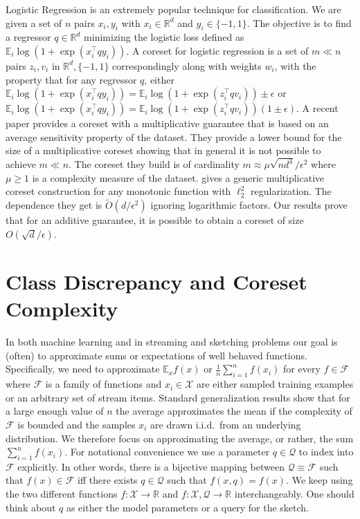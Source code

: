 \documentclass[anon,12pt]{colt2019} %
\newcommand{\R}{\mathbb{R}}
\newcommand{\E}{\mathbb{E}}
\newcommand{\eps}{\epsilon}
\newcommand{\F}{\mathcal{F}}
\newcommand{\X}{\mathcal{X}}
\newcommand{\Q}{\mathcal{Q}}
\begin{document}
Logistic Regression is an extremely popular technique for classification. We are given a set of $n$ pairs $x_i,y_i$ with $x_i \in \R^d$ and $y_i \in \{-1,1\}$. The objective is to find a regressor $q \in \R^d$ minimizing the logistic loss defined as $\E_i \log(1+\exp(x_i^\top q y_i))$. A coreset for logistic regression is a set of $m \ll n$ pairs $z_i, v_i$ in $\R^d, \{-1,1\}$ correspondingly along with weights $w_i$, with the property that for any regressor $q$, either $\E_i \log(1+\exp(x_i^\top q y_i)) = \E_i \log(1+\exp(z_i^\top q v_i)) \pm \eps$ or $\E_i \log(1+\exp(x_i^\top q y_i)) = \E_i \log(1+\exp(z_i^\top q v_i)) (1 \pm \eps)$. A recent paper \cite{DBLP:journals/corr/abs-1805-08571} provides a coreset with a multiplicative guarantee that is based on an average sensitivity property of the dataset. They provide a lower bound for the size of a multiplicative coreset showing that in general it is not possible to achieve $m \ll n$. The coreset they build is of cardinality $m \approx \mu\sqrt{nd^3}/\eps^2$ where $\mu \geq 1$ is a complexity measure of the dataset.  \cite{tolochinsky2018coresets} gives a generic multiplicative coreset construction for any monotonic function with $\ell_2^2$ regularization. The dependence they get is $\tilde O(d/\eps^2)$ ignoring logarithmic factors.  Our results prove that for an additive guarantee, it is possible to obtain a coreset of size $O(\sqrt{d}/\eps)$.


\section{Class Discrepancy and Coreset Complexity}

In both machine learning and in streaming and sketching problems our goal is (often) to approximate sums or expectations of well behaved functions.
Specifically, we need to approximate $\E_x f(x)$ or $\frac{1}{n}\sum_{i=1}^{n} f(x_i)$ for every $f\in \F$ where $\F$ is a family of functions and $x_i \in \X$ are either sampled training examples or an arbitrary set of stream items. 
Standard generalization results show that for a large enough value of $n$ the average approximates the mean if the complexity of $\F$ is bounded and the samples $x_i$ are drawn i.i.d.\ from an underlying distribution. We therefore focus on approximating the average, or rather, the sum $\sum_{i=1}^{n} f(x_i)$. For notational convenience we use a parameter $q \in \Q$ to index into $\F$ explicitly. 
In other words, there is a bijective mapping between $\Q \equiv \F$ such that $f(x) \in \F$ iff there exists $q\in\Q$ such that $f(x,q)=f(x)$.
We keep using the two different functions $f:\X\rightarrow\R$ and $f:\X,\Q\rightarrow\R$ interchangeably. 
One should think about $q$ as either the model parameters or a query for the sketch. 
\end{document}
